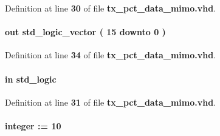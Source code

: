 Definition at line {\bf 30} of file {\bf tx\+\_\+pct\+\_\+data\+\_\+mimo.\+vhd}.

\paragraph[{fifo\+\_\+q}]{ {\bfseries \textcolor{keywordflow}{out}\textcolor{vhdlchar}{ }} {\bfseries \textcolor{comment}{std\+\_\+logic\+\_\+vector}\textcolor{vhdlchar}{ }\textcolor{vhdlchar}{(}\textcolor{vhdlchar}{ }\textcolor{vhdlchar}{ } \textcolor{vhdldigit}{15} \textcolor{vhdlchar}{ }\textcolor{keywordflow}{downto}\textcolor{vhdlchar}{ }\textcolor{vhdlchar}{ } \textcolor{vhdldigit}{0} \textcolor{vhdlchar}{ }\textcolor{vhdlchar}{)}\textcolor{vhdlchar}{ }} \hspace{0.3cm}{\ttfamily [Port]}}\label{classtx__pct__data__mimo_a7c744c162d0c13d1a1e11e62a4668a1d}


Definition at line {\bf 34} of file {\bf tx\+\_\+pct\+\_\+data\+\_\+mimo.\+vhd}.

\paragraph[{fifo\+\_\+rclk}]{ {\bfseries \textcolor{keywordflow}{in}\textcolor{vhdlchar}{ }} {\bfseries \textcolor{comment}{std\+\_\+logic}\textcolor{vhdlchar}{ }} \hspace{0.3cm}{\ttfamily [Port]}}\label{classtx__pct__data__mimo_a55bba49a6eee1be8306afc2b165c4586}


Definition at line {\bf 31} of file {\bf tx\+\_\+pct\+\_\+data\+\_\+mimo.\+vhd}.

\paragraph[{fifo\+\_\+size}]{ {\bfseries \textcolor{vhdlchar}{ }} {\bfseries \textcolor{comment}{integer}\textcolor{vhdlchar}{ }\textcolor{vhdlchar}{ }\textcolor{vhdlchar}{\+:}\textcolor{vhdlchar}{=}\textcolor{vhdlchar}{ }\textcolor{vhdlchar}{ } \textcolor{vhdldigit}{10} \textcolor{vhdlchar}{ }} \hspace{0.3cm}{\ttfamily [Generic]}}\label{classtx__pct__data__mimo_a22180059fd8cb98bf508670c8fe15583}


